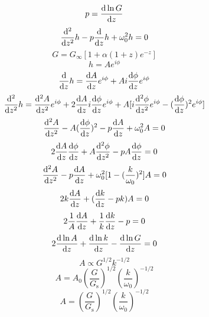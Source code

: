 \begin{equation}
    p=\frac{\mathrm{d}\ln G}{\mathrm{d} z}
\end{equation}
\begin{equation}
    \frac{\mathrm{d}^2}{\mathrm{d} z^2}h-p\frac{\mathrm{d}}{\mathrm{d} z}h+\omega_0^2h=0
\end{equation}
\begin{equation}
    G=G_\infty[1+\alpha(1+z)e^{-z}]
\end{equation}
\begin{equation}
    h=Ae^{i\phi}
\end{equation}
\begin{equation}
    \frac{\mathrm{d}}{\mathrm{d} z}h=\frac{\mathrm{d} A}{\mathrm{d} z}e^{i\phi}+Ai\frac{\mathrm{d} \phi}{\mathrm{d} z}e^{i\phi}
\end{equation}
\begin{equation}
    \frac{\mathrm{d}^2}{\mathrm{d} z^2}h=\frac{\mathrm{d}^2 A}{\mathrm{d} z^2}e^{i\phi}+2\frac{\mathrm{d} A}{\mathrm{d} z}i\frac{\mathrm{d} \phi}{\mathrm{d} z}e^{i\phi}+A[i\frac{\mathrm{d}^2 \phi}{\mathrm{d} z^2}e^{i\phi}-(\frac{\mathrm{d} \phi}{\mathrm{d} z})^2e^{i\phi}]
\end{equation}
\begin{equation}
    \frac{\mathrm{d}^2 A}{\mathrm{d} z^2}-A(\frac{\mathrm{d} \phi}{\mathrm{d} z})^2-p\frac{\mathrm{d} A}{\mathrm{d} z}+\omega_0^2A=0
\end{equation}
\begin{equation}
    2\frac{\mathrm{d} A}{\mathrm{d} z}\frac{\mathrm{d} \phi}{\mathrm{d} z}+A\frac{\mathrm{d}^2 \phi}{\mathrm{d} z^2}-pA\frac{\mathrm{d} \phi}{\mathrm{d} z}=0
\end{equation}
\begin{equation}
    \frac{\mathrm{d}^2 A}{\mathrm{d} z^2}-p\frac{\mathrm{d} A}{\mathrm{d} z}+\omega_0^2[1-(\frac{k}{\omega_0})^2]A=0
\end{equation}
\begin{equation}
    2k\frac{\mathrm{d} A}{\mathrm{d} z}+(\frac{\mathrm{d} k}{\mathrm{d} z}-pk)A=0
\end{equation}
\begin{equation}
    2\frac{1}{A}\frac{\mathrm{d} A}{\mathrm{d} z}+\frac{1}{k}\frac{\mathrm{d} k}{\mathrm{d} z}-p=0
\end{equation}
\begin{equation}
    2\frac{\mathrm{d}\ln A}{\mathrm{d} z}+\frac{\mathrm{d}\ln k}{\mathrm{d} z}-\frac{\mathrm{d}\ln G}{\mathrm{d} z}=0
\end{equation}
\begin{equation}
    A\propto G^{1/2}k^{-1/2}
\end{equation}
\begin{equation}
    A=A_0(\frac{G}{G_\text{s}})^{1/2}(\frac{k}{\omega_0})^{-1/2}
\end{equation}
\begin{equation}
    A=(\frac{G}{G_\text{s}})^{1/2}(\frac{k}{\omega_0})^{-1/2}
\end{equation}
